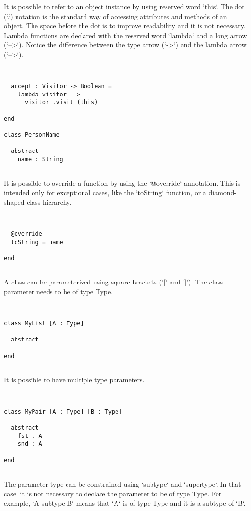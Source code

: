 \documentclass[12pt,a4paper]{article}
\begin{document}
  It is possible to refer to an object instance by using reserved word `this`.
   The dot (`.`) notation is the standard way of accessing attributes and methods of an
   object. The space before the dot is to improve readability and it is not necessary.
   Lambda functions are declared with the reserved word `lambda` and a long arrow (`-->`).
   Notice the difference between the type arrow (`->`) and the lambda arrow (`-->`).


\begin{lstlisting}


  accept : Visitor -> Boolean =
    lambda visitor -->
      visitor .visit (this)

end

class PersonName

  abstract
    name : String


\end{lstlisting}

  It is possible to override a function by using the `@override` annotation.
   This is intended only for exceptional cases, like the `toString` function, or a
   diamond-shaped class hierarchy.


\begin{lstlisting}


  @override
  toString = name

end


\end{lstlisting}

A class can be parameterized using square brackets ('[' and ']').
 The class parameter needs to be of type Type.


\begin{lstlisting}


class MyList [A : Type]

  abstract

end


\end{lstlisting}

It is possible to have multiple type parameters.


\begin{lstlisting}


class MyPair [A : Type] [B : Type]

  abstract
    fst : A
    snd : A

end


\end{lstlisting}

The parameter type can be constrained using `subtype` and `supertype`.
 In that case, it is not necessary to declare the parameter to be of type Type.
 For example, `A subtype B` means that `A` is of type Type and it is a subtype of `B`.
\end{document}
